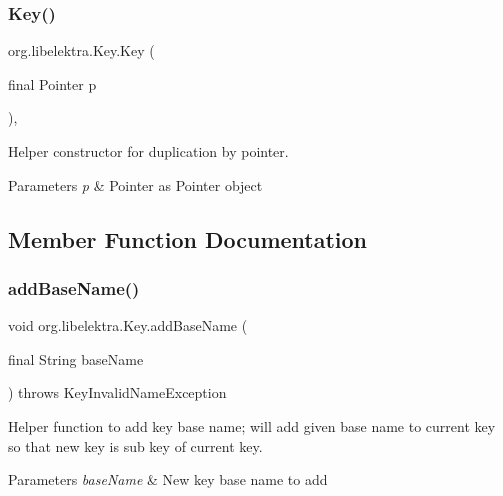 \subsubsection{\texorpdfstring{Key()}{Key()}\hspace{0.1cm}{\footnotesize\ttfamily [2/2]}}
{\footnotesize\ttfamily org.\+libelektra.\+Key.\+Key (\begin{DoxyParamCaption}\item[{final Pointer}]{p }\end{DoxyParamCaption})\hspace{0.3cm}{\ttfamily [inline]}, {\ttfamily [protected]}}



Helper constructor for duplication by pointer. 


\begin{DoxyParams}{Parameters}
{\em p} & Pointer as Pointer object \\
\hline
\end{DoxyParams}


\subsection{Member Function Documentation}
\mbox{\label{classorg_1_1libelektra_1_1Key_a07a939d44265c7b017104f3f37e9ca16}} 
\subsubsection{\texorpdfstring{add\+Base\+Name()}{addBaseName()}}
{\footnotesize\ttfamily void org.\+libelektra.\+Key.\+add\+Base\+Name (\begin{DoxyParamCaption}\item[{final String}]{base\+Name }\end{DoxyParamCaption}) throws Key\+Invalid\+Name\+Exception\hspace{0.3cm}{\ttfamily [inline]}}



Helper function to add key base name; will add given base name to current key so that new key is sub key of current key. 


\begin{DoxyParams}{Parameters}
{\em base\+Name} & New key base name to add \\
\hline
\end{DoxyParams}

